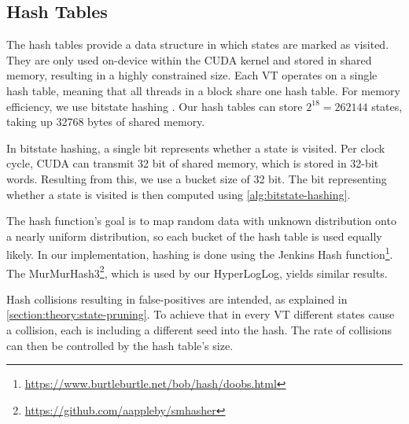 \documentclass[
fancyheadings, %
%
%
]{stsreprt}
\begin{document}

\subsection{Hash Tables}
\label{section:implementation:hash-tables}

The hash tables provide a data structure in which states are marked as visited.
They are only used on-device within the CUDA kernel and stored in shared memory, resulting in a highly constrained size.
Each VT operates on a single hash table, meaning that all threads in a block share one hash table.
For memory efficiency, we use bitstate hashing \cite{DeFrancisco2020.Grapple}.
Our hash tables can store $2^{18}=\num{262144}$ states, taking up \num{32768} bytes of shared memory.

In bitstate hashing, a single bit represents whether a state is visited.
Per clock cycle, CUDA can transmit 32 bit of shared memory, which is stored in 32-bit words.
Resulting from this, we use a bucket size of 32 bit.
The bit representing whether a state is visited is then computed using \cref{alg:bitstate-hashing}.

The hash function's goal is to map random data with unknown distribution onto a nearly uniform distribution, so each bucket of the hash table is used equally likely.
In our implementation, hashing is done using the Jenkins Hash function\footnote{\url{https://www.burtleburtle.net/bob/hash/doobs.html}}.
The MurMurHash3\footnote{\url{https://github.com/aappleby/smhasher}}, which is used by our HyperLogLog, yields similar results.

Hash collisions resulting in false-positives are intended, as explained in \cref{section:theory:state-pruning}.
To achieve that in every VT different states cause a collision, each is including a different seed into the hash.
The rate of collisions can then be controlled by the hash table's size.
\end{document}
